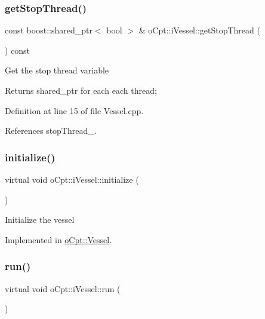 \subsubsection{\texorpdfstring{get\+Stop\+Thread()}{getStopThread()}}
{\footnotesize\ttfamily const boost\+::shared\+\_\+ptr$<$ bool $>$ \& o\+Cpt\+::i\+Vessel\+::get\+Stop\+Thread (\begin{DoxyParamCaption}{ }\end{DoxyParamCaption}) const}

Get the stop thread variable \begin{DoxyReturn}{Returns}
shared\+\_\+ptr for each each thread; 
\end{DoxyReturn}


Definition at line 15 of file Vessel.\+cpp.



References stop\+Thread\+\_\+.

\hypertarget{classo_cpt_1_1i_vessel_a866ddfa5330bbb24277de57554a41811}{}\label{classo_cpt_1_1i_vessel_a866ddfa5330bbb24277de57554a41811} 
\subsubsection{\texorpdfstring{initialize()}{initialize()}}
{\footnotesize\ttfamily virtual void o\+Cpt\+::i\+Vessel\+::initialize (\begin{DoxyParamCaption}{ }\end{DoxyParamCaption})\hspace{0.3cm}{\ttfamily [pure virtual]}}

Initialize the vessel 

Implemented in \hyperlink{classo_cpt_1_1_vessel_a64af8c6be9c915b76f37cff6abc5be36}{o\+Cpt\+::\+Vessel}.

\hypertarget{classo_cpt_1_1i_vessel_a636c138c3d8cb4ddbb2725d36fb12e07}{}\label{classo_cpt_1_1i_vessel_a636c138c3d8cb4ddbb2725d36fb12e07} 
\subsubsection{\texorpdfstring{run()}{run()}}
{\footnotesize\ttfamily virtual void o\+Cpt\+::i\+Vessel\+::run (\begin{DoxyParamCaption}{ }\end{DoxyParamCaption})\hspace{0.3cm}{\ttfamily [pure virtual]}}

